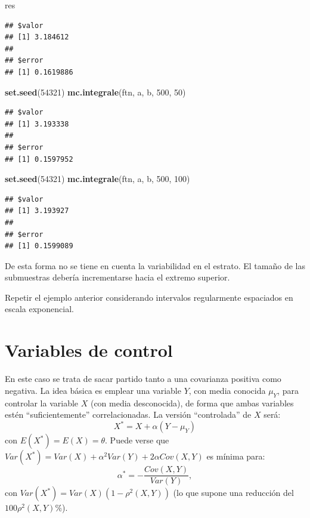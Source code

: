 \documentclass[]{book}
\newenvironment{Shaded}{\begin{snugshade}}{\end{snugshade}}
\newcommand{\KeywordTok}[1]{\textcolor[rgb]{0.13,0.29,0.53}{\textbf{#1}}}
\newcommand{\DecValTok}[1]{\textcolor[rgb]{0.00,0.00,0.81}{#1}}
\newcommand{\NormalTok}[1]{#1}
\theoremstyle{definition}
\theoremstyle{definition}
\theoremstyle{definition}
\theoremstyle{remark}
\let\BeginKnitrBlock\begin \let\EndKnitrBlock\end
\begin{document}
\begin{Shaded}
\begin{Highlighting}[]
\NormalTok{res}
\end{Highlighting}
\end{Shaded}

\begin{verbatim}
## $valor
## [1] 3.184612
## 
## $error
## [1] 0.1619886
\end{verbatim}

\begin{Shaded}
\begin{Highlighting}[]
\KeywordTok{set.seed}\NormalTok{(}\DecValTok{54321}\NormalTok{)}
\KeywordTok{mc.integrale}\NormalTok{(ftn, a, b, }\DecValTok{500}\NormalTok{, }\DecValTok{50}\NormalTok{)}
\end{Highlighting}
\end{Shaded}

\begin{verbatim}
## $valor
## [1] 3.193338
## 
## $error
## [1] 0.1597952
\end{verbatim}

\begin{Shaded}
\begin{Highlighting}[]
\KeywordTok{set.seed}\NormalTok{(}\DecValTok{54321}\NormalTok{)}
\KeywordTok{mc.integrale}\NormalTok{(ftn, a, b, }\DecValTok{500}\NormalTok{, }\DecValTok{100}\NormalTok{)}
\end{Highlighting}
\end{Shaded}

\begin{verbatim}
## $valor
## [1] 3.193927
## 
## $error
## [1] 0.1599089
\end{verbatim}

De esta forma no se tiene en cuenta la variabilidad en el estrato. El
tamaño de las submuestras debería incrementarse hacia el extremo
superior.

\BeginKnitrBlock{exercise}
\protect\hypertarget{exr:unnamed-chunk-13}{}{\label{exr:unnamed-chunk-13} }
\EndKnitrBlock{exercise} Repetir el ejemplo anterior considerando
intervalos regularmente espaciados en escala exponencial.

\section{Variables de control}\label{variables-de-control}

En este caso se trata de sacar partido tanto a una covarianza positiva
como negativa. La idea básica es emplear una variable \(Y\), con media
conocida \(\mu_{Y}\), para controlar la variable \(X\) (con media
desconocida), de forma que ambas variables estén ``suficientemente''
correlacionadas. La versión ``controlada'' de \(X\) será:
\[X^{\ast}=X+\alpha \left(  Y-\mu_{Y}\right)\] con
\(E(X^{\ast})=E(X)=\theta\). Puede verse que
\(Var(X^{\ast})=Var(X)+\alpha^{2}Var(Y)+2\alpha Cov(X,Y)\) es mínima
para: \[\alpha^{\ast}=-\frac{Cov(X,Y)}{Var(Y)},\] con
\(Var(X^{\ast}) = Var(X) \left( 1-\rho^{2} \left( X, Y \right) \right)\)
(lo que supone una reducción del \(100\rho^{2}\left( X, Y \right) \%\)).
\end{document}
